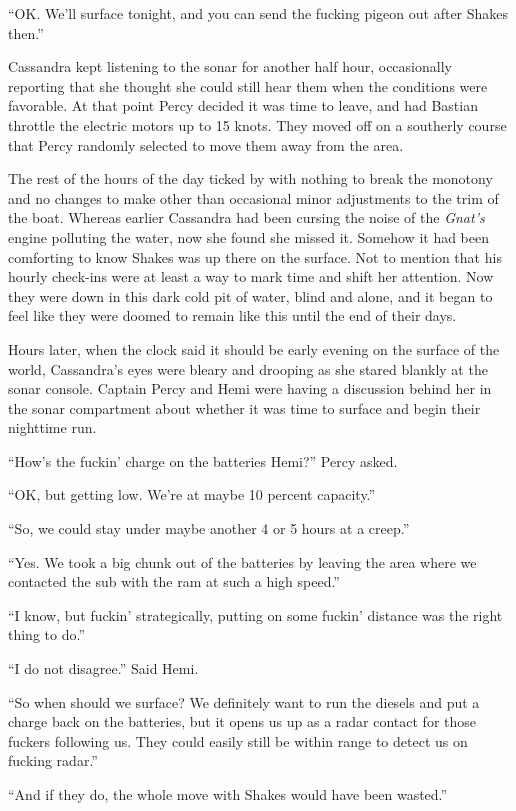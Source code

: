 \documentclass[]{scrbook}
\begin{document}
``OK. We'll surface tonight, and you can send the fucking pigeon out
after Shakes then.''

Cassandra kept listening to the sonar for another half hour,
occasionally reporting that she thought she could still hear them when
the conditions were favorable. At that point Percy decided it was time
to leave, and had Bastian throttle the electric motors up to 15 knots.
They moved off on a southerly course that Percy randomly selected to
move them away from the area.

The rest of the hours of the day ticked by with nothing to break the
monotony and no changes to make other than occasional minor adjustments
to the trim of the boat. Whereas earlier Cassandra had been cursing the
noise of the \emph{Gnat's} engine polluting the water, now she found she
missed it. Somehow it had been comforting to know Shakes was up there on
the surface. Not to mention that his hourly check-ins were at least a
way to mark time and shift her attention. Now they were down in this
dark cold pit of water, blind and alone, and it began to feel like they
were doomed to remain like this until the end of their days.

Hours later, when the clock said it should be early evening on the
surface of the world, Cassandra's eyes were bleary and drooping as she
stared blankly at the sonar console. Captain Percy and Hemi were having
a discussion behind her in the sonar compartment about whether it was
time to surface and begin their nighttime run.

``How's the fuckin' charge on the batteries Hemi?'' Percy asked.

``OK, but getting low. We're at maybe 10 percent capacity.''

``So, we could stay under maybe another 4 or 5 hours at a creep.''

``Yes. We took a big chunk out of the batteries by leaving the area
where we contacted the sub with the ram at such a high speed.''

``I know, but fuckin' strategically, putting on some fuckin' distance
was the right thing to do.''

``I do not disagree.'' Said Hemi.

``So when should we surface? We definitely want to run the diesels and
put a charge back on the batteries, but it opens us up as a radar
contact for those fuckers following us. They could easily still be
within range to detect us on fucking radar.''

``And if they do, the whole move with Shakes would have been wasted.''
\end{document}
